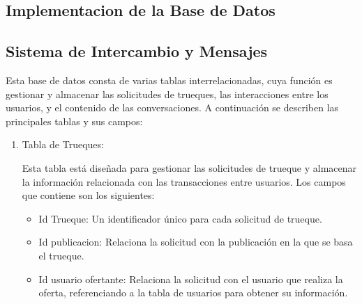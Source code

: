 \documentclass[11pt, a4paper, oneside]{book}
\begin{document}
\begin{itemize} 
    


\chapter{Implementacion de la Base de Datos} 

 

\section{Sistema de Intercambio y Mensajes} 

 

Esta base de datos consta de varias tablas interrelacionadas, cuya función es gestionar y almacenar las solicitudes de trueques, las interacciones entre los usuarios, y el contenido de las conversaciones. A continuación se describen las principales tablas y sus campos: 

 

 

\begin{enumerate} 

    \item Tabla de Trueques:  

 

Esta tabla está diseñada para gestionar las solicitudes de trueque y almacenar la información relacionada con las transacciones entre usuarios.  Los campos que contiene son los siguientes: 

 

\begin{itemize} 

    \item Id Trueque: Un identificador único para cada solicitud de trueque. 

\end{itemize} 

\begin{itemize} 

    \item Id publicacion: Relaciona la solicitud con la publicación en la que se basa el trueque. 

\end{itemize} 

\begin{itemize} 

    \item Id usuario ofertante: Relaciona la solicitud con el usuario que realiza la oferta, referenciando a la tabla de usuarios para obtener su información. 


\end{itemize}
\end{enumerate}
\end{itemize}
\end{document}
